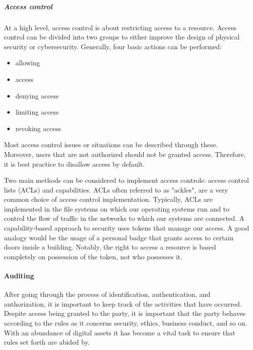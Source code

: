 \subparagraph{Access control}
At a high level, access control is about restricting access to a resource. Access control can be divided into two groups to either improve the design of physical security or cybersecurity. Generally, four basic actions can be performed: 
\begin{itemize}
    \item allowing
    \item access
    \item denying access
    \item limiting access
    \item revoking access
\end{itemize}
Most access control issues or situations can be described through these. Moreover, users that are not authorized should not be granted access. Therefore, it is best practice to disallow access by default.

Two main methods can be considered to implement access controls: access control lists (ACLs) and capabilities. ACLs often referred to as "ackles", are a very common choice of access control implementation. Typically, ACLs are implemented in the file systems on which our operating systems run and to control the flow of traffic in the networks to which our systems are connected. A capability-based approach to security uses tokens that manage our access. A good analogy would be the usage of a personal badge that grants access to certain doors inside a building. Notably, the right to access a resource is based completely on possession of the token, not who possesses it.

\paragraph{Auditing}
After going through the process of identification, authentication, and authorization, it is important to keep track of the activities that have occurred. Despite access being granted to the party, it is important that the party behaves according to the rules as it concerns security, ethics, business conduct, and so on. With an abundance of digital assets it has become a vital task to ensure that rules set forth are abided by.


